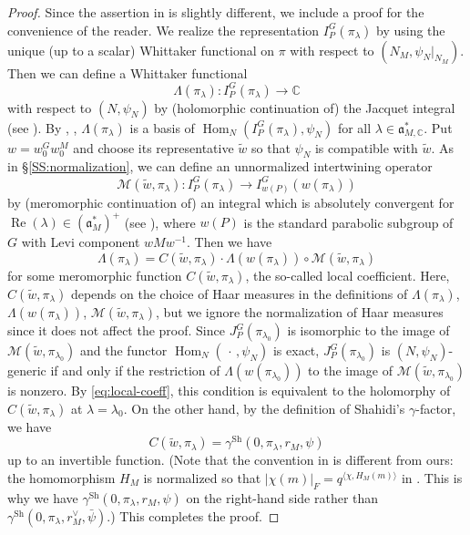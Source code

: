 \documentclass[11pt]{amsart}
\numberwithin{equation}{section}
\theoremstyle{plain}
\theoremstyle{definition}
\theoremstyle{remark}
\def\Hom{\operatorname{Hom}}
\def\Re{\operatorname{Re}}
\def\Sh{\mathrm{Sh}}
\def\CC{\mathbb{C}}
\def\M{\mathcal{M}}
\def\aa{\mathfrak{a}}
\begin{document}
\begin{proof}
Since the assertion in \cite[Proposition 1.3]{hm} is slightly different, we include a proof for the convenience of the reader.
We realize the representation $I^G_P(\pi_\lambda)$ by using the unique (up to a scalar) Whittaker functional on $\pi$ with respect to $(N_M, \psi_N|_{N_M})$.
Then we can define a Whittaker functional
\[
 \Lambda(\pi_\lambda) : I^G_P(\pi_\lambda) \longrightarrow \CC
\]
with respect to $(N,\psi_N)$ by (holomorphic continuation of) the Jacquet integral (see \cite[Proposition 3.1]{shahidi-certain}).
By \cite{rodier}, \cite[Corollary 1.7]{cs}, $\Lambda(\pi_\lambda)$ is a basis of $\Hom_N(I^G_P(\pi_\lambda), \psi_N)$ for all $\lambda \in \aa_{M,\CC}^*$.
Put $w = w^G_0 w^M_0$ and choose its representative $\tilde{w}$ so that $\psi_N$ is compatible with $\tilde{w}$.
As in \S \ref{SS:normalization}, we can define an unnormalized intertwining operator
\[
 \M(\tilde{w}, \pi_\lambda) : I^G_P(\pi_\lambda) \longrightarrow I^G_{w(P)}(w(\pi_\lambda))
\]
by (meromorphic continuation of) an integral which is absolutely convergent for $\Re(\lambda) \in (\aa^*_M)^+$ (see \cite[Proposition IV.2.1]{w0}), where $w(P)$ is the standard parabolic subgroup of $G$ with Levi component $w M w^{-1}$.
Then we have
\begin{equation}
\label{eq:local-coeff}
 \Lambda(\pi_\lambda) = C(\tilde{w}, \pi_\lambda) \cdot \Lambda(w(\pi_\lambda)) \circ \M(\tilde{w}, \pi_\lambda) 
\end{equation}
for some meromorphic function $C(\tilde{w}, \pi_\lambda)$, the so-called local coefficient.
Here, $C(\tilde{w}, \pi_\lambda)$ depends on the choice of Haar measures in the definitions of $\Lambda(\pi_\lambda)$, $\Lambda(w(\pi_\lambda))$, $\M(\tilde{w}, \pi_\lambda)$, but we ignore the normalization of Haar measures since it does not affect the proof.
Since $J^G_P(\pi_{\lambda_0})$ is isomorphic to the image of $\M(\tilde{w}, \pi_{\lambda_0})$ and the functor $\Hom_N(\, \cdot \, , \psi_N)$ is exact, $J^G_P(\pi_{\lambda_0})$ is $(N, \psi_N)$-generic if and only if the restriction of $\Lambda(w(\pi_{\lambda_0}))$ to the image of $\M(\tilde{w}, \pi_{\lambda_0})$ is nonzero.
By \eqref{eq:local-coeff}, this condition is equivalent to the holomorphy of $C(\tilde{w}, \pi_\lambda)$ at $\lambda = \lambda_0$.
On the other hand, by the definition of Shahidi's $\gamma$-factor, we have
\[
 C(\tilde{w}, \pi_\lambda) = \gamma^{\Sh}(0, \pi_\lambda, r_M, \psi)
\]
up to an invertible function.
(Note that the convention in \cite{shahidi} is different from ours: the homomorphism $H_M$ is normalized so that $|\chi(m)|_F = q^{\langle \chi, H_M(m) \rangle}$ in \cite{shahidi}.
This is why we have $\gamma^{\Sh}(0, \pi_\lambda, r_M, \psi)$ on the right-hand side rather than $\gamma^{\Sh}(0, \pi_\lambda, r_M^\vee, \bar{\psi})$.)
This completes the proof.
\end{proof}
\end{document}
